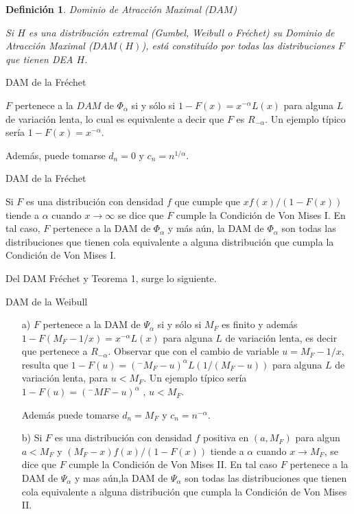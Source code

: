 \documentclass[
  12pt]{article}
\newtheorem{definition}{Definición}[section]
\begin{document}
\begin{definition} Dominio de Atracción Maximal ($DAM$)

Si $H$ es una distribución extremal (Gumbel, Weibull o Fréchet) su Dominio de Atracción Maximal ($DAM(H)$), está constituído por todas las distribuciones $F$ que tienen DEA $H$.
\end{definition}

\begin{theorem} DAM de la Fréchet

$F$ pertenece a la $DAM$ de $\Phi_{\alpha}$ si y sólo si
$1-F(x)=x^{-\alpha} L(x)$ para alguna $L$ de variación lenta,
lo cual es equivalente a decir que $F$ es $R_{-\alpha}$. Un ejemplo típico sería $1-F(x)= x^{-\alpha}$.

Además, puede tomarse $d_n=0$ y $c_n= n^{1/\alpha}$.
\end{theorem}

\begin{Corolario} DAM de la Fréchet

Si $F$ es una distribución con densidad $f$ que cumple que $xf(x)/(1-F(x))$ tiende a $\alpha$ cuando $x\rightarrow \infty$ se dice que $F$ cumple la Condición de Von Mises I. En tal caso, $F$ pertenece a la DAM de $\Phi_{\alpha}$ y más aún, la DAM de $\Phi_{\alpha}$ son todas las distribuciones que tienen cola equivalente a alguna distribución que cumpla la Condición de Von Mises I.
\end{Corolario}

Del DAM Fréchet y Teorema 1, surge lo siguiente.

\begin{theorem} DAM de la Weibull

\begin{itemize}
\item[a)] $F$ pertenece a la DAM de $\Psi_{\alpha}$ si y sólo si $M_F$ es finito y además $1-F(M_F -1/x)=x^{-\alpha}L(x)$ para alguna $L$ de variación lenta, es decir que pertenece a $R_{-\alpha}$. Observar que con el cambio de variable $u=M_F -1/x$,
resulta que $1-F(u)=(^{-}M_F -u)^{\alpha} L(1/(M_F -u))$ para alguna $L$ de variación lenta, para $u< M_F$. Un ejemplo típico sería $1-F(u)=(^{-}MF -u)^{\alpha}$ , $u< M_F$. 

Además puede tomarse $d_n= M_F$ y $c_n= n^{-\alpha}$.

\item[b)] Si $F$ es una distribución con densidad $f$ positiva en $(a,M_F)$ para algun $a< M_F$ y $(M_F -x)f(x)/(1-F(x))$ tiende a $\alpha$ cuando $x\rightarrow M_F$, se dice que $F$ cumple la Condición de Von Mises II. En tal caso $F$ pertenece a la DAM de $\Psi_{\alpha}$ y mas aún,la DAM de $\Psi_{\alpha}$ son todas las distribuciones que tienen cola equivalente a alguna distribución que cumpla la Condición de Von Mises II.
\end{itemize}
\end{theorem}
\end{document}
